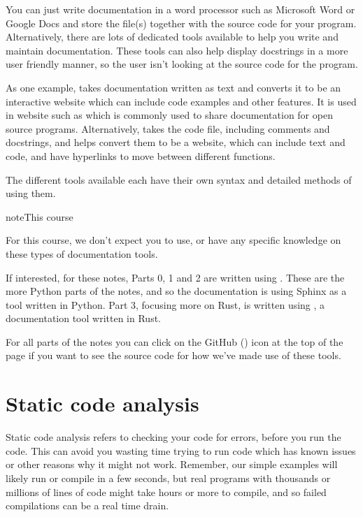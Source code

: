 \documentclass[letterpaper,10pt,british]{sphinxmanual}
\let\sphinxpxdimen\pdfpxdimen\else\newdimen\sphinxpxdimen
\begin{document}
\sphinxAtStartPar
You can just write documentation in a word processor such as Microsoft Word or Google Docs and store the file(s) together with the source code for your program. Alternatively, there are lots of dedicated tools available to help you write and maintain documentation. These tools can also help display docstrings in a more user friendly manner, so the user isn’t looking at the source code for the program.

\sphinxAtStartPar
As one example,  takes documentation written as text and converts it to be an interactive website which can include code examples and other features. It is used in website such as  which is commonly used to share documentation for open source programs. Alternatively,  takes the code file, including comments and docstrings, and helps convert them to be a website, which can include text and code, and have hyperlinks to move between different functions.

\sphinxAtStartPar
The different tools available each have their own syntax and detailed methods of using them.

\begin{sphinxadmonition}{note}{This course}

\sphinxAtStartPar
For this course, we don’t expect you to use, or have any specific knowledge on these types of documentation tools.

\sphinxAtStartPar
If interested, for these notes, Parts 0, 1 and 2 are written using . These are the more Python parts of the notes, and so the documentation is using Sphinx as a tool written in Python. Part 3, focusing more on Rust, is written using , a documentation tool written in Rust.

\sphinxAtStartPar
For all parts of the notes you can click on the GitHub (\sphinxincludegraphics[width=20\sphinxpxdimen]{{GitHub_Invertocat_Dark1}.svg}) icon at the top of the page if you want to see the source code for how we’ve made use of these tools.
\end{sphinxadmonition}

\sphinxstepscope


\section{Static code analysis}
\label{\detokenize{chapters/software_development_tools/static_code_analysis:static-code-analysis}}\label{\detokenize{chapters/software_development_tools/static_code_analysis::doc}}
\sphinxAtStartPar
Static code analysis refers to checking your code for errors, before you run the code. This can avoid you wasting time trying to run code which has known issues or other reasons why it might not work. Remember, our simple examples will likely run or compile in a few seconds, but real programs with thousands or millions of lines of code might take hours or more to compile, and so failed compilations can be a real time drain.
\end{document}
